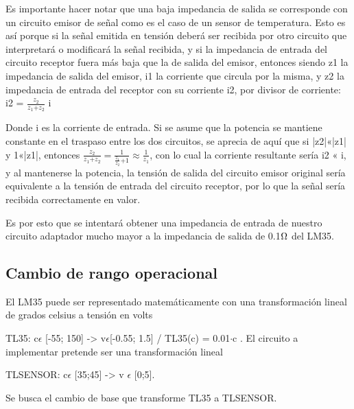 \documentclass[../../main.tex]{subfiles}
\begin{document}
Es importante hacer notar que una baja impedancia de salida se corresponde con un circuito emisor de señal como es el caso de un sensor de temperatura. Esto es así porque si la señal emitida en tensión deberá ser recibida por otro circuito que interpretará o modificará la señal recibida, y si la impedancia de entrada del circuito receptor fuera más baja que la de salida del emisor, entonces
siendo z1 la impedancia de salida del emisor, i1 la corriente que circula por la misma, y z2 la impedancia de entrada del receptor con su corriente i2, por divisor de corriente:
i2 = $\frac{z_{2}}{z_{1}\text{+}z_{2}}$ i\par
Donde i es la corriente de entrada. Si se asume que la potencia se mantiene constante en el traspaso entre los dos circuitos,
se aprecia de aquí que si |z2|«|z1| y 1«|z1|, entonces $\frac{z_{2}}{z_{1}\text{+}z_{2}}=\frac{1}{\frac{z_{1}}{z_{2}}\text{+}1}\approx\frac{1}{z_{1}}$, con lo cual la corriente resultante sería i2 « i, y al mantenerse la potencia, la tensión de salida del circuito emisor original sería equivalente a la tensión de entrada del circuito receptor, por lo que la señal sería recibida correctamente en valor.  \par
Es por esto que se intentará obtener una impedancia de entrada de nuestro circuito adaptador mucho mayor a la impedancia de salida de 0.1$\ohm$ del LM35.


\subsection{Cambio de rango operacional}

El LM35 puede ser representado matemáticamente con una transformación lineal de grados celsius a tensión en volts\par 
TL35: c$\epsilon$ [-55; 150] -> v$\epsilon$[-0.55; 1.5] / TL35(c) = 0.01$\cdot$c . 
El circuito a implementar pretende ser una transformación lineal\par
TLSENSOR: c$\epsilon$ [35;45] -> v $\epsilon$ [0;5].

Se busca el cambio de base que transforme TL35 a TLSENSOR.
\end{document}
